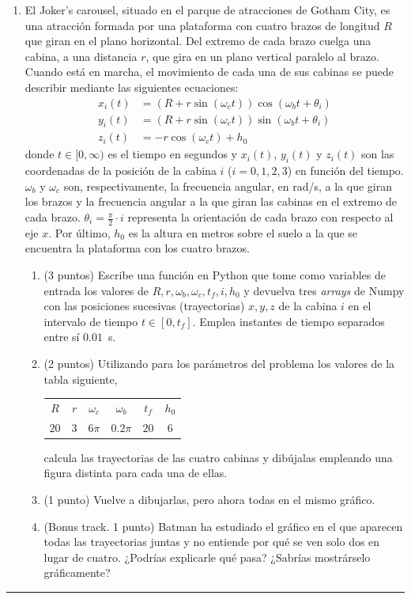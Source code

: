 \begin{enumerate}
	\item El Joker's carousel, situado en el parque de atracciones de Gotham City, es una atracción formada por una plataforma con cuatro brazos de longitud $R$ que giran en el plano horizontal. Del extremo de cada brazo cuelga una cabina, a una distancia $r$, que gira en un plano vertical paralelo al brazo. Cuando está en marcha, el movimiento de cada una de sus cabinas se puede describir mediante las siguientes ecuaciones:
	\begin{equation*}
		\begin{split}
			x_i(t) &= \left(R+r\sin(\omega_c t)\right)\cos(\omega_b t+ \theta_i)\\
			y_i(t) &= \left(R+r\sin(\omega_c t)\right)\sin(\omega_b t+ \theta_i)\\
			z_i(t) &= -r\cos(\omega_c t) + h_0
		\end{split}
	\end{equation*}
	donde $t \in [0,\infty)$ es el tiempo en segundos y $x_i(t)$, $y_i(t)$ y $z_i(t)$ son las coordenadas de la posición de la cabina $i$ ($i = 0,1,2,3$) en función del tiempo. $\omega_b$ y $\omega_c$ son, respectivamente, la frecuencia angular, en rad/s, a la que giran los brazos y la frecuencia angular a la que giran las cabinas en el extremo de cada brazo. $\theta_i = \frac{\pi}{2}\cdot i$ representa la orientación de cada brazo con respecto al eje $x$. Por último, $h_0$ es la altura en metros sobre el suelo a la que se encuentra la plataforma con los cuatro brazos.

	\begin{enumerate}
		\item (3 puntos) Escribe una función en Python que tome como variables de entrada los valores de $R,r,\omega_b,\omega_c,t_f,i,h_0$ y devuelva tres \emph{arrays} de Numpy con las posiciones sucesivas (trayectorias) $x,y,z$ de la cabina $i$ en el intervalo de tiempo $t\in [0,t_f]$. Emplea instantes de tiempo separados entre sí $0.01$~s.

		\item (2 puntos) Utilizando para los parámetros del problema los valores de la tabla siguiente,
		\begin{table}[h]
			\centering
			\begin{tabular}{c c c c c c}
				\hline
				$R$ & $r$ & $\omega_c$ & $\omega_b$ & $t_f$ & $h_0$\\
				$20$ & $3$ & $6\pi$ & $0.2\pi$ & $20$ & $6$\\
				\hline
			\end{tabular}
		\end{table}

		calcula las trayectorias de las cuatro cabinas y dibújalas empleando una figura distinta para cada una de ellas.
		\item (1 punto) Vuelve a dibujarlas, pero ahora todas en el mismo gráfico.
		\item (Bonus track. 1 punto) Batman ha estudiado el gráfico en el que aparecen todas las trayectorias juntas y no entiende por qué se ven solo dos en lugar de cuatro. ¿Podrías explicarle qué pasa? ¿Sabrías mostrárselo gráficamente?
	\end{enumerate}
\end{enumerate}

\noindent\rule{\textwidth}{0.4pt}
\fussy
